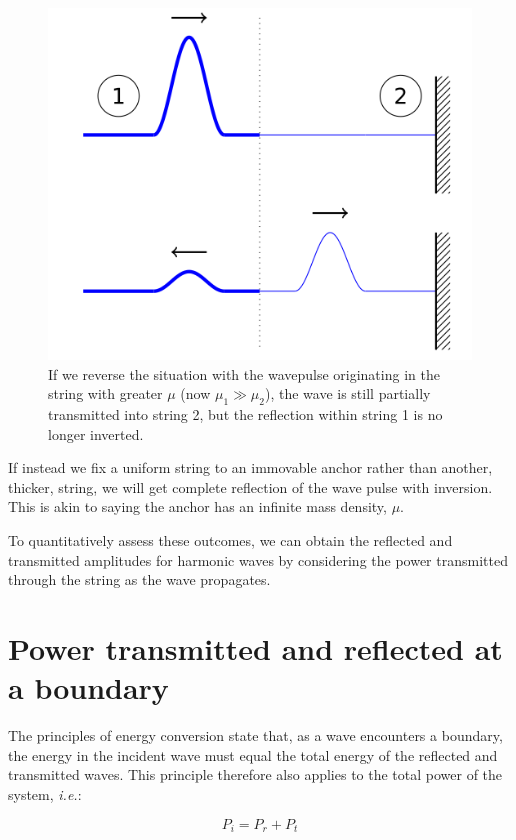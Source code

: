 \documentclass[
]{book}
\begin{document}
\begin{figure}

{\centering \includegraphics[width=0.7\linewidth]{visualisations/LaTeX/ch8-wavesonstrings2} 

}

\caption{If we reverse the situation with the wavepulse originating in the string with greater $\mu$ (now $\mu_1 \gg \mu_2$), the wave is still partially transmitted into string 2, but the reflection within string 1 is no longer inverted.}\label{fig:ch8-thickthininversion1b}
\end{figure}

If instead we fix a uniform string to an immovable anchor rather than another, thicker, string, we will get complete reflection of the wave pulse with inversion. This is akin to saying the anchor has an infinite mass density, \(\mu\).

To quantitatively assess these outcomes, we can obtain the reflected and transmitted amplitudes for harmonic waves by considering the power transmitted through the string as the wave propagates.

\hypertarget{sec:ch8-powertransmittedreflected}{%
\section{Power transmitted and reflected at a boundary}\label{sec:ch8-powertransmittedreflected}}

The principles of energy conversion state that, as a wave encounters a boundary, the energy in the incident wave must equal the total energy of the reflected and transmitted waves. This principle therefore also applies to the total power of the system, \emph{i.e.}:

\begin{equation}
P_i = P_r + P_t
\label{eq:ch8-powerconservation1}
\end{equation}
\end{document}
